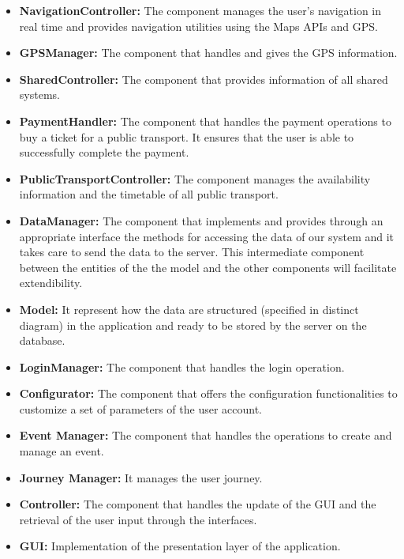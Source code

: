 \begin{itemize}
\item
\textbf{NavigationController:} The component manages the user's navigation in real time and provides navigation utilities using the Maps APIs and GPS. 
\item
\textbf{GPSManager:} The component that handles and gives the GPS information.
\item
\textbf{SharedController:} The component that provides information of all shared systems.
\item
\textbf{PaymentHandler:} The component that handles the payment operations to buy a ticket for a public transport. It ensures that the user is able to successfully complete the payment.
\item
\textbf{PublicTransportController:} The component manages the availability information and the timetable of all public transport.
\item
\textbf{DataManager:} The component that implements and provides through an appropriate interface the methods for accessing the data of our system and it takes care to send the data to the server. This intermediate component between the entities of the the model and the other components will facilitate extendibility.
\item
\textbf{Model:} It represent how the data are structured (specified in distinct diagram) in the application and ready to be stored by the server on the database.
\item
\textbf{LoginManager:} The component that handles the login operation.
\item
\textbf{Configurator:} The component that offers the configuration functionalities
to customize a set of parameters of the user account.
\item
\textbf{Event Manager:} The component that handles the operations to create and manage an event.
\item
\textbf{Journey Manager:} It manages the user journey.
\item
\textbf{Controller:} The component that handles the update of the GUI and the retrieval of the user input through the interfaces.
\item
\textbf{GUI:} Implementation of the presentation layer of the application.
\end{itemize}

